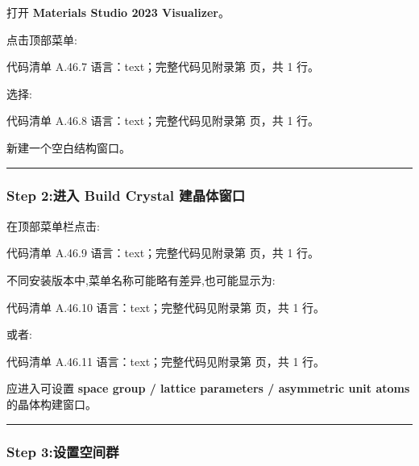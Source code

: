 \documentclass[lang=cn,scheme=chinese,color=blue,device=normal,toc=onecol,math=cm]{elegantbook}
\begin{document}
打开 \textbf{Materials Studio 2023 Visualizer}。\par


点击顶部菜单:\par


\begin{codeindexbox}{代码清单 A.46.7}
语言：text；完整代码见附录第 \pageref{code:46:7} 页，共 1 行。
\end{codeindexbox}


选择:\par


\begin{codeindexbox}{代码清单 A.46.8}
语言：text；完整代码见附录第 \pageref{code:46:8} 页，共 1 行。
\end{codeindexbox}


新建一个空白结构窗口。\par


\medskip\hrule\medskip


\subsubsection{Step 2:进入 Build Crystal 建晶体窗口}


在顶部菜单栏点击:\par


\begin{codeindexbox}{代码清单 A.46.9}
语言：text；完整代码见附录第 \pageref{code:46:9} 页，共 1 行。
\end{codeindexbox}


不同安装版本中,菜单名称可能略有差异,也可能显示为:\par


\begin{codeindexbox}{代码清单 A.46.10}
语言：text；完整代码见附录第 \pageref{code:46:10} 页，共 1 行。
\end{codeindexbox}


或者:\par


\begin{codeindexbox}{代码清单 A.46.11}
语言：text；完整代码见附录第 \pageref{code:46:11} 页，共 1 行。
\end{codeindexbox}


应进入可设置 \textbf{space group /\allowbreak{} lattice parameters /\allowbreak{} asymmetric unit atoms} 的晶体构建窗口。\par


\medskip\hrule\medskip


\subsubsection{Step 3:设置空间群}
\end{document}

